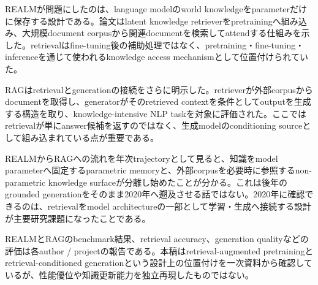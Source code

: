 
REALMが問題にしたのは、language modelのworld knowledgeをparameterだけに保存する設計である。論文はlatent knowledge retrieverをpretrainingへ組み込み、大規模document corpusから関連documentを検索してattendする仕組みを示した。retrievalはfine-tuning後の補助処理ではなく、pretraining・fine-tuning・inferenceを通じて使われるknowledge access mechanismとして位置付けられていた。\autocite{src-4bf65d8fc7dc}


RAGはretrievalとgenerationの接続をさらに明示した。retrieverが外部corpusからdocumentを取得し、generatorがそのretrieved contextを条件としてoutputを生成する構造を取り、knowledge-intensive NLP taskを対象に評価された。ここではretrievalが単にanswer候補を返すのではなく、生成modelのconditioning sourceとして組み込まれている点が重要である。\autocite{src-38c08ba169f1,src-c441b6f2b8f4}


REALMからRAGへの流れを年次trajectoryとして見ると、知識をmodel parameterへ固定するparametric memoryと、外部corpusを必要時に参照するnon-parametric knowledge surfaceが分離し始めたことが分かる。これは後年のgrounded generationをそのまま2020年へ遡及させる話ではない。2020年に確認できるのは、retrievalをmodel architectureの一部として学習・生成へ接続する設計が主要研究課題になったことである。\autocite{src-38c08ba169f1,src-4bf65d8fc7dc,src-c441b6f2b8f4}


\begin{claimboundary}
REALMとRAGのbenchmark結果、retrieval accuracy、generation qualityなどの評価は各author / projectの報告である。本稿はretrieval-augmented pretrainingとretrieval-conditioned generationという設計上の位置付けを一次資料から確認しているが、性能優位や知識更新能力を独立再現したものではない。\autocite{src-38c08ba169f1,src-4bf65d8fc7dc,src-c441b6f2b8f4}
\end{claimboundary}
